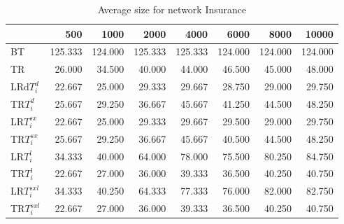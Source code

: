 \begin{table}
\begin{center}
\begin{tabular}{lrrrrrrr}
 & 500 &  1000 & 2000 & 4000 & 6000& 8000&  10000\\\hline
BT & 125.333 & 124.000 & 125.333 & 125.333 & 124.000 & 124.000 & 124.000\\\hline
TR & 26.000 & 34.500 & 40.000 & 44.000 & 46.500 & 45.000 & 48.000\\\hline
LRd$T_i^d$ & 22.667 & 25.000 & 29.333 & 29.667 & 28.750 & 29.000 & 29.750\\\hline
TR$T_i^d$ & 25.667 & 29.250 & 36.667 & 45.667 & 41.250 & 44.500 & 48.250\\\hline
LR$T_i^{sx}$ & 22.667 & 25.000 & 29.333 & 29.667 & 29.500 & 29.000 & 29.750\\\hline
TR$T_i^{sx}$ & 25.667 & 29.250 & 36.667 & 45.667 & 40.500 & 44.500 & 48.250\\\hline
LR$T_i^l$ & 34.333 & 40.000 & 64.000 & 78.000 & 75.500 & 80.250 & 84.750\\\hline
TR$T_i^l$ & 22.667 & 27.000 & 36.000 & 39.333 & 36.500 & 40.250 & 40.750\\\hline
LR$T_i^{sxl}$ & 34.333 & 40.250 & 64.333 & 77.333 & 76.000 & 82.000 & 82.750\\\hline
TR$T_i^{sxl}$ & 22.667 & 27.000 & 36.000 & 39.333 & 36.500 & 40.250 & 40.750\\\hline
\end{tabular}
\end{center}
\caption{Average size for network Insurance }
\label{Insurancesi}
\end{table}

